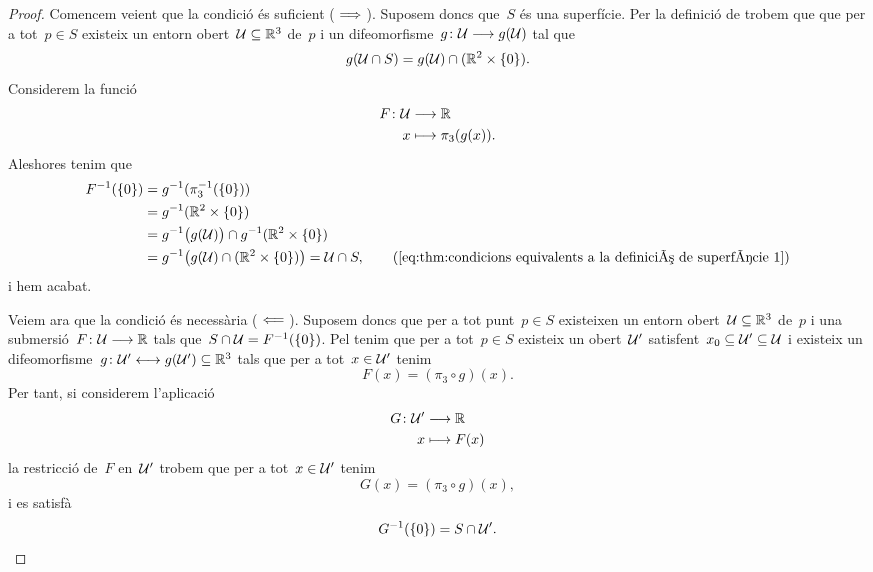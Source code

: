 \documentclass[../../main.tex]{subfiles}
\begin{document}
    \begin{proof}
        Comencem veient que la condició és suficient (\(\implies\)).
        Suposem doncs que~\(S\) és una superfície.
        Per la definició de  trobem que que per a tot~\(p\in S\) existeix un entorn obert~\(\mathcal{U}\subseteq\mathbb{R}^{3}\) de~\(p\) i un difeomorfisme~\(g\colon\mathcal{U}\longrightarrow g(\mathcal{U})\) tal que
        \begin{equation}
            \label{eq:thm:condicions equivalents a la definició de superfície 1}
            g(\mathcal{U}\cap S)=g(\mathcal{U})\cap(\mathbb{R}^{2}\times\{0\}).
        \end{equation}
        Considerem la funció
        \begin{align*}
            F\colon\mathcal{U}&\longrightarrow\mathbb{R} \\
            x&\longmapsto\pi_{3}(g(x)).
        \end{align*}
        Aleshores tenim que
        \begin{align*}
            F^{-1}(\{0\})&=g^{-1}(\pi_{3}^{-1}(\{0\})) \\
            &=g^{-1}(\mathbb{R}^{2}\times\{0\}) \\
            &=g^{-1}\big(g(\obert{U})\big)\cap g^{-1}(\mathbb{R}^{2}\times\{0\})\\
            &=g^{-1}\big(g(\obert{U})\cap(\mathbb{R}^{2}\times\{0\})\big)=\obert{U}\cap S, \tag{\ref{eq:thm:condicions equivalents a la definició de superfície 1}} %
        \end{align*}
        i hem acabat.

        Veiem ara que la condició és necessària (\(\impliedby\)).
        Suposem doncs que per a tot punt~\(p\in S\) existeixen un entorn obert~\(\mathcal{U}\subseteq\mathbb{R}^{3}\) de~\(p\) i una submersió~\(F\colon\mathcal{U}\longrightarrow\mathbb{R}\) tals que~\(S\cap\mathcal{U}=F^{-1}(\{0\})\).
        Pel  tenim que per a tot~\(p\in S\) existeix un obert~\(\mathcal{U}'\) satisfent~\(x_{0}\subseteq\mathcal{U}'\subseteq\mathcal{U}\) i existeix un difeomorfisme~\(g\colon\mathcal{U}'\longleftrightarrow g(\mathcal{U}')\subseteq\mathbb{R}^{3}\) tals que per a tot~\(x\in\mathcal{U}'\) tenim
        \[
            F(x)=(\pi_{3}\circ g)(x).
        \]
        Per tant, si considerem l'aplicació
        \begin{align*}
            G\colon\mathcal{U}'&\longrightarrow\mathbb{R} \\
            x&\longmapsto F(x)
        \end{align*}
        la restricció de~\(F\) en~\(\mathcal{U}'\) trobem que per a tot~\(x\in\mathcal{U}'\) tenim
        \[
            G(x)=(\pi_{3}\circ g)(x),
        \]
        i es satisfà
        \begin{equation}
            \label{eq:thm:condicions equivalents a la definició de superfície 2}
            G^{-1}(\{0\})=S\cap\mathcal{U}'.
        \end{equation}


\end{proof}
\end{document}

